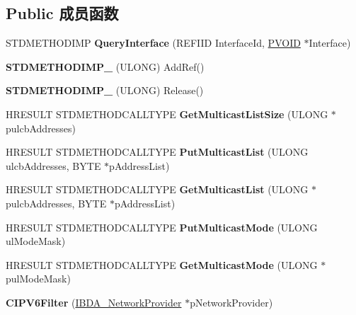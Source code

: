 \subsection*{Public 成员函数}
\begin{DoxyCompactItemize}
\item 
\mbox{\label{class_c_i_p_v6_filter_a1950a83db1676deb9620252d0d22a061}} 
S\+T\+D\+M\+E\+T\+H\+O\+D\+I\+MP {\bfseries Query\+Interface} (R\+E\+F\+I\+ID Interface\+Id, \hyperlink{interfacevoid}{P\+V\+O\+ID} $\ast$Interface)
\item 
\mbox{\label{class_c_i_p_v6_filter_aa5d42b7cddea834c374242d88940595b}} 
{\bfseries S\+T\+D\+M\+E\+T\+H\+O\+D\+I\+M\+P\+\_\+} (U\+L\+O\+NG) Add\+Ref()
\item 
\mbox{\label{class_c_i_p_v6_filter_acc2d7a658a1f2553c8cab079d2bebafd}} 
{\bfseries S\+T\+D\+M\+E\+T\+H\+O\+D\+I\+M\+P\+\_\+} (U\+L\+O\+NG) Release()
\item 
\mbox{\label{class_c_i_p_v6_filter_ac979bcad21a230f880c5beddc4a96f41}} 
H\+R\+E\+S\+U\+LT S\+T\+D\+M\+E\+T\+H\+O\+D\+C\+A\+L\+L\+T\+Y\+PE {\bfseries Get\+Multicast\+List\+Size} (U\+L\+O\+NG $\ast$pulcb\+Addresses)
\item 
\mbox{\label{class_c_i_p_v6_filter_afa24b4c6e7e68f30f1122d48bd4ce16a}} 
H\+R\+E\+S\+U\+LT S\+T\+D\+M\+E\+T\+H\+O\+D\+C\+A\+L\+L\+T\+Y\+PE {\bfseries Put\+Multicast\+List} (U\+L\+O\+NG ulcb\+Addresses, B\+Y\+TE $\ast$p\+Address\+List)
\item 
\mbox{\label{class_c_i_p_v6_filter_a4dfdf6d233650e3c1f15471970e92aec}} 
H\+R\+E\+S\+U\+LT S\+T\+D\+M\+E\+T\+H\+O\+D\+C\+A\+L\+L\+T\+Y\+PE {\bfseries Get\+Multicast\+List} (U\+L\+O\+NG $\ast$pulcb\+Addresses, B\+Y\+TE $\ast$p\+Address\+List)
\item 
\mbox{\label{class_c_i_p_v6_filter_a593d9eee41fd84ad899404967a427ec7}} 
H\+R\+E\+S\+U\+LT S\+T\+D\+M\+E\+T\+H\+O\+D\+C\+A\+L\+L\+T\+Y\+PE {\bfseries Put\+Multicast\+Mode} (U\+L\+O\+NG ul\+Mode\+Mask)
\item 
\mbox{\label{class_c_i_p_v6_filter_aec67514d4595306200a7e991145cbec5}} 
H\+R\+E\+S\+U\+LT S\+T\+D\+M\+E\+T\+H\+O\+D\+C\+A\+L\+L\+T\+Y\+PE {\bfseries Get\+Multicast\+Mode} (U\+L\+O\+NG $\ast$pul\+Mode\+Mask)
\item 
\mbox{\label{class_c_i_p_v6_filter_add337339c70e14444ee17a2a9e3fbca3}} 
{\bfseries C\+I\+P\+V6\+Filter} (\hyperlink{interface_i_b_d_a___network_provider}{I\+B\+D\+A\+\_\+\+Network\+Provider} $\ast$p\+Network\+Provider)
\end{DoxyCompactItemize}

